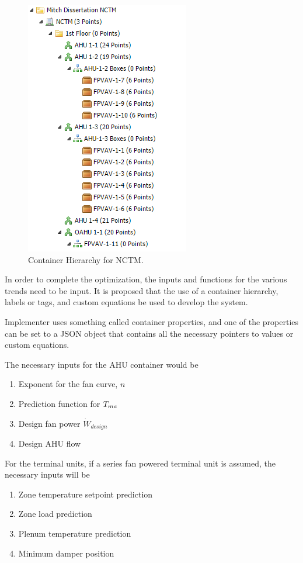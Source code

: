 \begin{figure}
\centering
\includegraphics{Images/ContainerHierarchy.PNG}
\caption{Container Hierarchy for NCTM.}
\label{fig:ContainerHierarchy}
\end{figure}

In order to complete the optimization, the inputs and functions for the
various trends need to be input. It is proposed that the use of a
container hierarchy, labels or tags, and custom equations be used to
develop the system.

Implementer uses something called container properties, and one of the
properties can be set to a JSON object that contains all the necessary
pointers to values or custom equations.

The necessary inputs for the AHU container would be 
\begin{enumerate}
    \item Exponent for the fan curve, \(n\)
    \item Prediction function for \(T_{ma}{}\) 
    \item Design fan power \(\dot{W}_{design}\)
    \item Design AHU flow 
\end{enumerate}
For the terminal units, if a series fan powered
terminal unit is assumed, the necessary inputs will be
\begin{enumerate}
    \item Zone temperature setpoint prediction
    \item Zone load prediction
    \item Plenum temperature prediction
    \item Minimum damper position
\end{enumerate}

